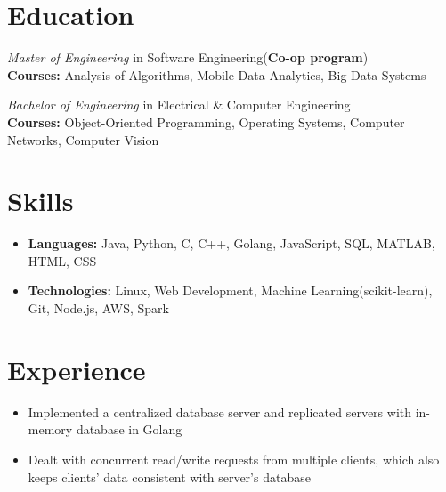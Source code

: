 \documentclass{resume}
\begin{document}



\section{Education}
\textit{Master of Engineering} in Software Engineering(\textbf{Co-op program})\\
\textbf{Courses: }Analysis of Algorithms, Mobile Data Analytics, Big Data Systems

\textit{Bachelor of Engineering} in Electrical \& Computer Engineering\\
\textbf{Courses: }Object-Oriented Programming, Operating Systems, Computer Networks, Computer Vision

\section{Skills}
\begin{itemize}[parsep=0.5ex]
  \item \textbf{Languages: }Java, Python, C, C++, Golang, JavaScript, SQL, MATLAB, HTML, CSS
  \item \textbf{Technologies: }Linux, Web Development, Machine Learning(scikit-learn), Git, Node.js, AWS, Spark
\end{itemize}



\section{Experience}

\begin{itemize}
  \item  Implemented a centralized database server and replicated servers with in-memory database in Golang 
  \item Dealt with concurrent read/write requests from multiple clients, which also keeps clients' data consistent with server's database

\end{itemize}
\end{document}
